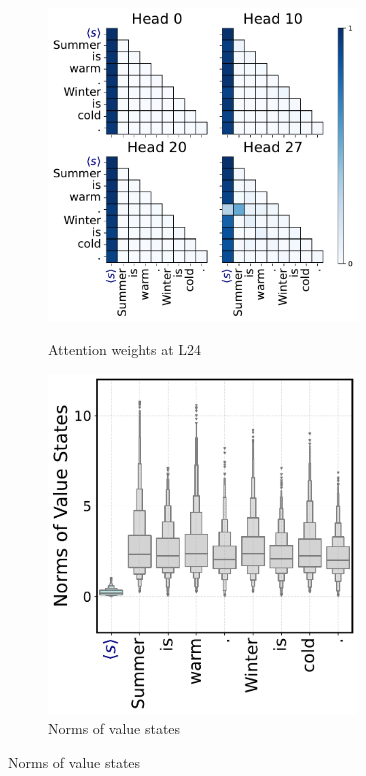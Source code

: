 \begin{figure}[t]
  \centering
  \begin{subfigure}[t]{0.32\textwidth}
      \centering 
      \caption{\small Attention weights at L24}
      \includegraphics[width=0.9\textwidth]{Figures/demo_attn_sink.pdf}
      \label{fig:attention_sinks_wide_random}
  \end{subfigure}
  \hfill
  \begin{subfigure}[t]{0.3\textwidth}
      \centering 
      \caption{\small Norms of value states}
      \includegraphics[width=0.9\textwidth]{Figures/demo_val_drain.pdf}

\end{subfigure}
\end{figure}
